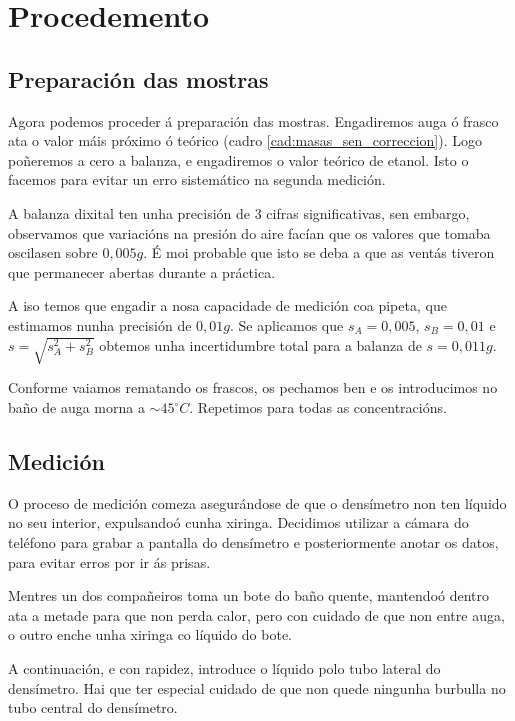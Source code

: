 \documentclass[12pt, a4paper, titlepage]{article}
\begin{document}
  \newpage
  \section{Procedemento}

  \subsection{Preparación das mostras}
  \label{sec:preparacion_mostras}

  Agora podemos proceder á preparación das mostras. Engadiremos auga ó frasco ata o valor máis próximo ó teórico (cadro \ref{cad:masas_sen_correccion}). Logo poñeremos a cero a balanza, e engadiremos o valor teórico de etanol. Isto o facemos para evitar un erro sistemático na segunda medición.

  A balanza dixital ten unha precisión de 3 cifras significativas, sen embargo, observamos que variacións na presión do aire facían que os valores que tomaba oscilasen sobre $0,005 g$. É moi probable que isto se deba a que as ventás tiveron que permanecer abertas durante a práctica.

  A iso temos que engadir a nosa capacidade de medición coa pipeta, que estimamos nunha precisión de $0,01 g$. Se aplicamos que $s_A = 0,005$, $s_B = 0,01$ e $s = \sqrt{s_A^2 + s_B^2}$ obtemos unha incertidumbre total para a balanza de $s = 0,011g$.

  Conforme vaiamos rematando os frascos, os pechamos ben e os introducimos no baño de auga morna a $\sim 45 ^\circ C$. Repetimos para todas as concentracións.

  \subsection{Medición}

  O proceso de medición comeza asegurándose de que o densímetro non ten líquido no seu interior, expulsandoó cunha xiringa. Decidimos utilizar a cámara do teléfono para grabar a pantalla do densímetro e posteriormente anotar os datos, para evitar erros por ir ás prisas.

  Mentres un dos compañeiros toma un bote do baño quente, mantendoó dentro ata a metade para que non perda calor, pero con cuidado de que non entre auga, o outro enche unha xiringa co líquido do bote.

  A continuación, e con rapidez, introduce o líquido polo tubo lateral do densímetro. Hai que ter especial cuidado de que non quede ningunha burbulla no tubo central do densímetro.
\end{document}

